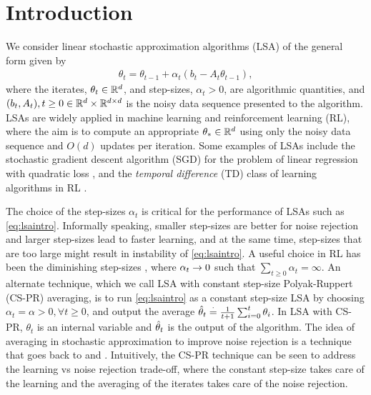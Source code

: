 \section{Introduction}
We consider linear stochastic approximation algorithms (LSA) of the general form given by
\begin{align}\label{eq:lsaintro}
\theta_t=\theta_{t-1}+\alpha_t (b_t-A_t \theta_{t-1}),
\end{align}
where the iterates, $\theta_t\in \mathbb{R}^d$, and step-sizes, $\alpha_t>0$, are algorithmic quantities, and $(b_t,A_t), t\geq 0\in \mathbb{R}^d\times \mathbb{R}^{d \times d}$ is the noisy data sequence presented to the algorithm.
LSAs are widely applied in machine learning and reinforcement learning (RL), where the aim is to compute an appropriate $\theta_*\in \mathbb{R}^d$ using only the noisy data sequence and $O(d)$ updates per iteration. Some examples of LSAs include the stochastic gradient descent algorithm (SGD) for the problem of linear regression with quadratic loss \cite{bach,bachaistats}, and the \emph{temporal difference} (TD) class of learning algorithms in RL \cite{sutton,konda-tsitsiklis,gtd,gtd2,gtdmp}.\par

The choice of the step-sizes $\alpha_t$ is critical for the performance of LSAs such as \eqref{eq:lsaintro}.
Informally speaking, smaller step-sizes are better for noise rejection and larger step-sizes lead to faster learning, and at the same time, step-sizes that are too large might result in instability of \eqref{eq:lsaintro}. A useful choice in RL has been the diminishing step-sizes \cite{gtd2,gtdmp,borkarbook,konda-tsitsiklis}, where $\alpha_t\rightarrow 0$ such that $\sum_{t\geq 0} \alpha_t=\infty$. An alternate technique, which we call LSA with constant step-size Polyak-Ruppert (CS-PR) averaging, is to run \eqref{eq:lsaintro} as a constant step-size LSA by choosing $\alpha_t=\alpha>0,\forall t\geq 0$, and output the average $\hat{\theta}_t\stackrel{\cdot}{=}\frac{1}{t+1}\sum_{i=0}^t \theta_i$. In LSA with CS-PR, $\theta_t$ is an internal variable and $\hat{\theta}_t$ is the output of the algorithm. The idea of averaging in stochastic approximation to improve noise rejection is a technique that goes back to  \citet{ruppert} and \citet{polyak-judisky}. Intuitively, the CS-PR technique can be seen to address the learning vs noise rejection trade-off, where the constant step-size takes care of the learning  and the averaging of the iterates takes care of the noise rejection.
